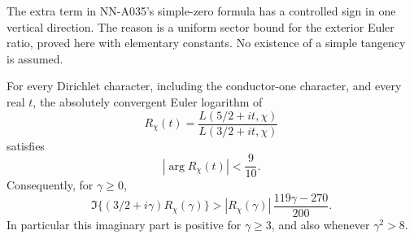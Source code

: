 The extra term in NN-A035's simple-zero formula has a controlled
sign in one vertical direction. The reason is a uniform sector
bound for the exterior Euler ratio, proved here with elementary
constants. No existence of a simple tangency is assumed.

\begin{lemma}
\label{lem:A044-euler-sector}
For every Dirichlet character, including the conductor-one
character, and every real $t$, the absolutely convergent Euler
logarithm of
\[
              R_\chi(t)=
                 \frac{L(5/2+it,\chi)}{L(3/2+it,\chi)}
\]
satisfies
\[
                   |\arg R_\chi(t)|<\frac9{10}.
\]
Consequently, for $\gamma\ge0$,
\begin{equation}\label{eq:A044-exterior-positive}
 \Im\{(3/2+i\gamma)R_\chi(\gamma)\}
   >|R_\chi(\gamma)|\,\frac{119\gamma-270}{200}.
\end{equation}
In particular this imaginary part is positive for
$\gamma\ge3$, and also whenever $\gamma^2>8$.
\end{lemma}

